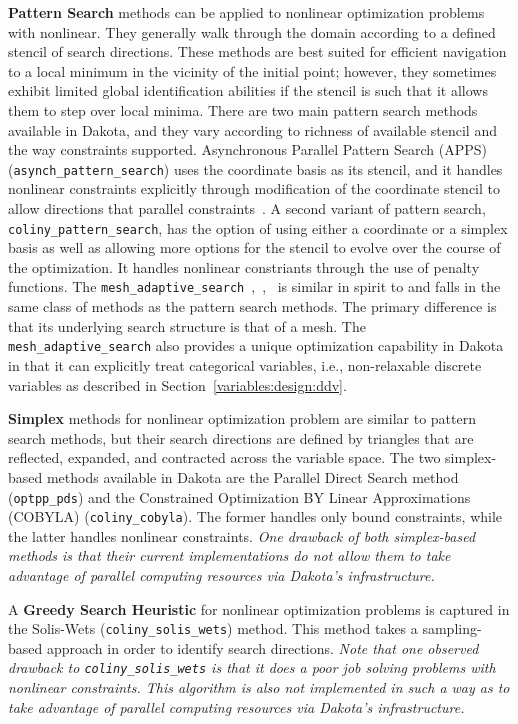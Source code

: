 {\bf Pattern Search} methods can be applied to nonlinear optimization
problems with nonlinear.  They generally walk through the domain
according to a defined stencil of search directions.  These methods
are best suited for efficient navigation to a local minimum in the
vicinity of the initial point; however, they sometimes exhibit limited
global identification abilities if the stencil is such that it allows
them to step over local minima.  There are two main pattern search
methods available in Dakota, and they vary according to richness of
available stencil and the way constraints supported.  Asynchronous
Parallel Pattern Search (APPS)~\cite{GrKo06}
(\texttt{asynch\_pattern\_search}) uses the coordinate basis as its
stencil, and it handles nonlinear constraints explicitly through
modification of the coordinate stencil to allow directions that
parallel constraints~\cite{GrKo07}.  A second variant of pattern
search, \texttt{coliny\_pattern\_search}, has the option of using
either a coordinate or a simplex basis as well as allowing more
options for the stencil to evolve over the course of the optimization.
It handles nonlinear constriants through the use of penalty functions.
The
\texttt{mesh\_adaptive\_search}~\cite{AuLeTr09a},~\cite{Nomad},~\cite{Le2011a}
is similar in spirit to and falls in the same class of methods as the
pattern search methods.  The primary difference is that its underlying
search structure is that of a mesh.  The
\texttt{mesh\_adaptive\_search} also provides a unique optimization
capability in Dakota in that it can explicitly treat categorical
variables, i.e., non-relaxable discrete variables as described in
Section~\ref{variables:design:ddv}.

{\bf Simplex} methods for nonlinear optimization problem are similar
to pattern search methods, but their search directions are defined by
triangles that are reflected, expanded, and contracted across the
variable space.  The two simplex-based methods available in Dakota are
the Parallel Direct Search method~\cite{Den94b} (\texttt{optpp\_pds})
and the Constrained Optimization BY Linear Approximations (COBYLA)
(\texttt{coliny\_cobyla}).  The former handles only bound constraints,
while the latter handles nonlinear constraints.  \emph{One drawback of
  both simplex-based methods is that their current implementations do
  not allow them to take advantage of parallel computing resources via
  Dakota's infrastructure.}

A {\bf Greedy Search Heuristic} for nonlinear optimization problems is
captured in the Solis-Wets (\texttt{coliny\_solis\_wets}) method.
This method takes a sampling-based approach in order to identify
search directions.  \emph{Note that one observed drawback to
  \texttt{coliny\_solis\_wets} is that it does a poor job solving
  problems with nonlinear constraints.  This algorithm is also not
  implemented in such a way as to take advantage of parallel computing
  resources via Dakota's infrastructure.}

